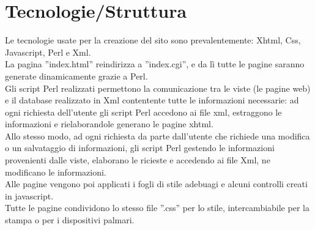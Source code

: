 \section{Tecnologie/Struttura }
Le tecnologie usate per la creazione del sito sono prevalentemente: Xhtml, Css, Javascript, Perl e Xml. \\
La pagina ''index.html'' reindirizza a ''index.cgi'', e da lì tutte le pagine saranno generate dinamicamente grazie a Perl.\\
Gli script Perl realizzati permettono la comunicazione tra le viste (le pagine web) e il database realizzato in Xml contentente tutte le informazioni necessarie: ad ogni richiesta dell'utente gli script Perl accedono ai file xml, estraggono le informazioni e rielaborandole generano le pagine xhtml.\\
Allo stesso modo, ad ogni richiesta da parte dall'utente che richiede una modifica o un salvataggio di informazioni, gli script Perl gestendo le informazioni provenienti dalle viste, elaborano le ricieste e accedendo ai file Xml, ne modificano le informazioni.\\
Alle pagine vengono poi applicati i fogli di stile adebuagi e alcuni controlli creati in javascript.\\
Tutte le pagine condividono lo stesso file ''.css'' per lo stile, intercambiabile per la stampa o per i dispositivi palmari.

